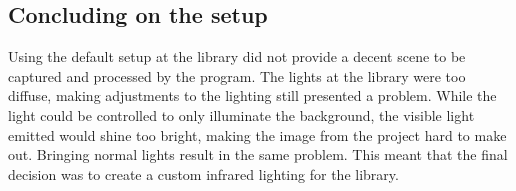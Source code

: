 \subsection{Concluding on the setup}
Using the default setup at the library did not provide a decent scene to be captured and processed by the program. The lights at the library were too diffuse, making adjustments to the lighting still presented a problem. While the light could be controlled to only illuminate the background, the visible light emitted would shine too bright, making the image from the project hard to make out. Bringing normal lights result in the same problem. This meant that the final decision was to create a custom infrared lighting for the library.
